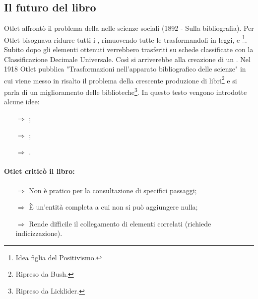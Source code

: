 \subsection{Il futuro del libro}

Otlet affrontò il problema della 
nelle scienze sociali (1892 - Sulla bibliografia).
Per Otlet bisognava ridurre tutti i , rimuovendo
tutte le  trasformandoli in leggi,  e \footnote{Idea figlia del Positivismo.}.
Subito dopo gli elementi ottenuti verrebbero trasferiti su schede classificate con la 
Classificazione Decimale Universale. Così si arriverebbe alla creazione di un .
Nel 1918 Otlet pubblica "Trasformazioni nell'apparato bibliografico delle scienze" in cui viene messo in risalto il problema
della crescente produzione di libri\footnote{Ripreso da Bush.} e si parla di un miglioramento delle biblioteche\footnote{Ripreso da Licklider.}. In
questo testo vengono introdotte alcune idee:

\begin{itemize}
    \item [$\Rightarrow$] ;
    \item [$\Rightarrow$] ;
    \item [$\Rightarrow$] .
\end{itemize}

\paragraph{Otlet criticò il libro:}

\begin{itemize}
    \item [$\Rightarrow$] Non è pratico per la consultazione di specifici passaggi;
    \item [$\Rightarrow$] È un'entità completa a cui non si può aggiungere nulla;
    \item [$\Rightarrow$] Rende difficile il collegamento di elementi correlati (richiede indicizzazione).
\end{itemize}



